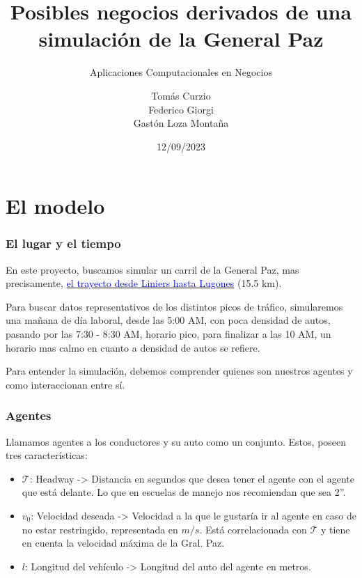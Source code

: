\documentclass[10pt, compress]{beamer}
\title{Posibles negocios derivados de una simulaci\'on de la General Paz }
\subtitle{Aplicaciones Computacionales en Negocios}
\date{12/09/2023}
\author{Tom\'as Curzio \\ Federico Giorgi \\ Gast\'on Loza Monta\~na  }
\institute{Universidad Torcuato Di Tella}
\begin{document}
\maketitle

\section{El modelo}

\begin{frame}[fragile]

\frametitle{El lugar y el tiempo}
En este proyecto, buscamos simular un carril de la General Paz, mas precisamente, \href{https://www.google.com.ar/maps/dir/-34.6549026,-58.5273448/RN+A001,+Buenos+Aires/@-34.5529941,-58.5215513,13z/data=!4m9!4m8!1m0!1m5!1m1!1s0x95bcb6a69ad1fc61:0x7f1d6a8008451498!2m2!1d-58.4682776!2d-34.5357282!3e0?entry=ttu}{\textcolor{blue}{el trayecto desde Liniers hasta Lugones}} (15.5 km). 

Para buscar datos representativos de los distintos picos de tr\'afico, simularemos una ma\~nana de d\'ia laboral, desde las 5:00 AM, con poca densidad de autos, pasando por las 7:30 - 8:30 AM, horario pico, para finalizar a las 10 AM, un horario mas calmo en cuanto a densidad de autos se refiere.

Para entender la simulaci\'on, debemos comprender quienes son nuestros agentes y como interaccionan entre s\'i.

\end{frame}

\begin{frame}[fragile]

\frametitle{Agentes}

Llamamos agentes a los conductores y su auto como un conjunto. Estos, poseen tres caracter\'isticas:

\begin{itemize}
\item $\mathcal{T}$: Headway -> Distancia en segundos que desea tener el agente con el agente que est\'a delante. Lo que en escuelas de manejo nos recomiendan que sea 2''.
\item $v_0$: Velocidad deseada -> Velocidad a la que le gustar\'ia ir al agente en caso de no estar restringido, representada en $m/s$. Est\'a correlacionada con $\mathcal{T}$ y tiene en cuenta la velocidad m\'axima de la Gral. Paz.
\item $l$: Longitud del veh\'iculo -> Longitud del auto del agente en metros.
\end{itemize}

\end{frame}
\end{document}
